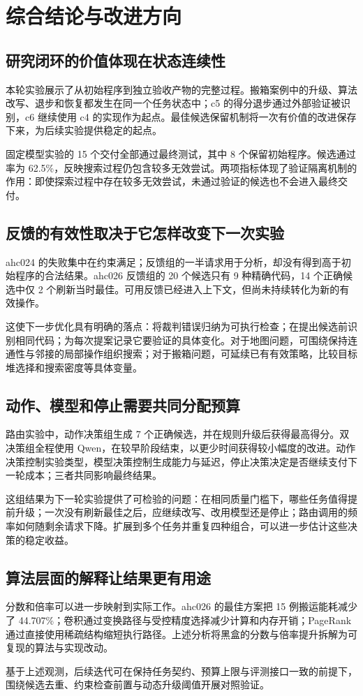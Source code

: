 \section{综合结论与改进方向}\label{sec:conclusions}
\subsection{研究闭环的价值体现在状态连续性}
本轮实验展示了从初始程序到独立验收产物的完整过程。搬箱案例中的升级、算法改写、退步和恢复都发生在同一个任务状态中；c5 的得分退步通过外部验证被识别，c6 继续使用 c4 的实现作为起点。最佳候选保留机制将一次有价值的改进保存下来，为后续实验提供稳定的起点。

固定模型实验的 15 个交付全部通过最终测试，其中 8 个保留初始程序。候选通过率为 62.5\%，反映搜索过程仍包含较多无效尝试。两项指标体现了验证隔离机制的作用：即使探索过程中存在较多无效尝试，未通过验证的候选也不会进入最终交付。

\subsection{反馈的有效性取决于它怎样改变下一次实验}
ahc024 的失败集中在约束满足；反馈组的一半请求用于分析，却没有得到高于初始程序的合法结果。ahc026 反馈组的 20 个候选只有 9 种精确代码，14 个正确候选中仅 2 个刷新当时最佳。可用反馈已经进入上下文，但尚未持续转化为新的有效操作。

这使下一步优化具有明确的落点：将裁判错误归纳为可执行检查；在提出候选前识别相同代码；为每次提案记录它要验证的具体变化。对于地图问题，可围绕保持连通性与邻接的局部操作组织搜索；对于搬箱问题，可延续已有有效策略，比较目标堆选择和搜索密度等具体变量。

\subsection{动作、模型和停止需要共同分配预算}
路由实验中，动作决策组生成 7 个正确候选，并在规则升级后获得最高得分。双决策组全程使用 Qwen，在较早阶段结束，以更少时间获得较小幅度的改进。动作决策控制实验类型，模型决策控制生成能力与延迟，停止决策决定是否继续支付下一轮成本；三者共同影响最终结果。

这组结果为下一轮实验提供了可检验的问题：在相同质量门槛下，哪些任务值得提前升级；一次没有刷新最佳之后，应继续改写、改用模型还是停止；路由调用的频率如何随剩余请求下降。扩展到多个任务并重复四种组合，可以进一步估计这些决策的稳定收益。

\subsection{算法层面的解释让结果更有用途}
分数和倍率可以进一步映射到实际工作。ahc026 的最佳方案把 15 例搬运能耗减少了 44.707\%；卷积通过变换路径与受控精度选择减少计算和内存开销；PageRank 通过直接使用稀疏结构缩短执行路径。上述分析将黑盒的分数与倍率提升拆解为可复现的算法与实现改动。

基于上述观测，后续迭代可在保持任务契约、预算上限与评测接口一致的前提下，围绕候选去重、约束检查前置与动态升级阈值开展对照验证。
